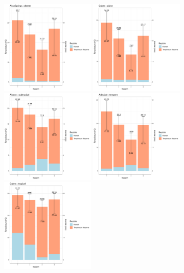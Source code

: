 \documentclass{article}
\begin{document}
\begin{figure}[p]
    \centering
        \includegraphics[page=1,width=0.4\textwidth]{Images/Temp_and_Rainfalldesert.pdf}
        \includegraphics[page=1,width=0.4\textwidth]{Images/Temp_and_Rainfallplaine.pdf}
        \includegraphics[page=1,width=0.4\textwidth]{Images/Temp_and_Rainfallsubtropical.pdf}
        \includegraphics[page=1,width=0.4\textwidth]{Images/Temp_and_Rainfalltempere.pdf}
        \includegraphics[page=1,width=0.4\textwidth]{Images/Temp_and_Rainfalltropical.pdf}

\end{figure}
\end{document}
